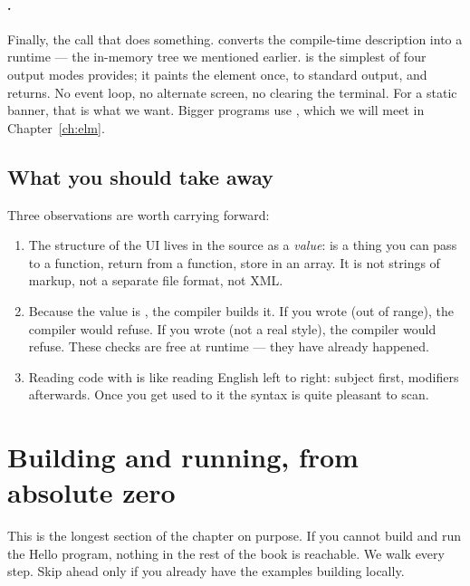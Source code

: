 \paragraph{.}
Finally, the call that does something.  converts the
compile-time description  into a runtime  ---
the in-memory tree we mentioned earlier.  is the
simplest of four output modes \maya{} provides; it paints the element
once, to standard output, and returns. No event loop, no alternate
screen, no clearing the terminal. For a static banner, that is what
we want. Bigger programs use , which we will meet in
Chapter~\ref{ch:elm}.

\subsection{What you should take away}

Three observations are worth carrying forward:

\begin{enumerate}[leftmargin=*]
  \item The structure of the UI lives in the \cpp{} source as a
    \emph{value}:  is a thing you can pass to a function,
    return from a function, store in an array. It is not strings of
    markup, not a separate file format, not XML.
  \item Because the value is , the compiler builds
    it. If you wrote  (out of range), the
    compiler would refuse. If you wrote 
    (not a real style), the compiler would refuse. These checks are
    free at runtime --- they have already happened.
  \item Reading code with \code{|} is like reading English left to
    right: subject first, modifiers afterwards. Once you get used
    to it the syntax is quite pleasant to scan.
\end{enumerate}

\section{Building and running, from absolute zero}

This is the longest section of the chapter on purpose. If you cannot
build and run the Hello program, nothing in the rest of the book is
reachable. We walk every step. Skip ahead only if you already have
the \maya{} examples building locally.

